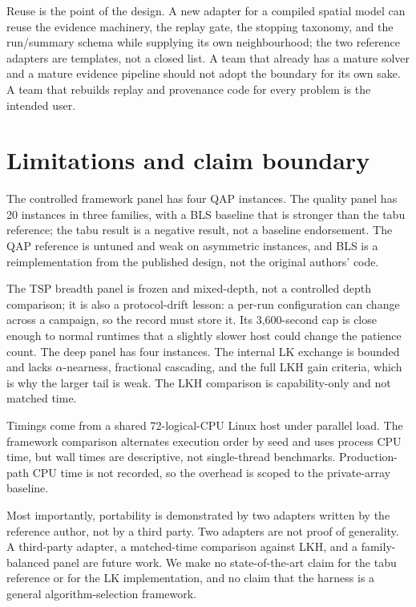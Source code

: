 \documentclass[10pt]{article}
\begin{document}
Reuse is the point of the design. A new adapter for a compiled spatial model can reuse the evidence
machinery, the replay gate, the stopping taxonomy, and the run/summary schema while supplying its
own neighbourhood; the two reference adapters are templates, not a closed list. A team that already
has a mature solver and a mature evidence pipeline should not adopt the boundary for its own sake.
A team that rebuilds replay and provenance code for every problem is the intended user.

\section{Limitations and claim boundary}

The controlled framework panel has four QAP instances. The quality panel has 20 instances in three
families, with a BLS baseline that is stronger than the tabu reference; the tabu result is a negative
result, not a baseline endorsement. The QAP reference is untuned and weak on asymmetric instances,
and BLS is a reimplementation from the published design, not the original authors' code.

The TSP breadth panel is frozen and mixed-depth, not a controlled depth comparison; it is also a
protocol-drift lesson: a per-run configuration can change across a campaign, so the record must store
it. Its 3,600-second
cap is close enough to normal runtimes that a slightly slower host could change the patience count.
The deep panel has four instances. The internal LK exchange is bounded and lacks $\alpha$-nearness,
fractional cascading, and the full LKH gain criteria, which is why the larger tail is weak. The LKH
comparison is capability-only and not matched time.

Timings come from a shared 72-logical-CPU Linux host under parallel load. The framework comparison
alternates execution order by seed and uses process CPU time, but wall times are descriptive, not
single-thread benchmarks. Production-path CPU time is not recorded, so the overhead is scoped to the
private-array baseline.

Most importantly, portability is demonstrated by two adapters written by the reference author, not
by a third party. Two adapters are not proof of generality. A third-party adapter, a matched-time
comparison against LKH, and a family-balanced panel are future work. We make no state-of-the-art
claim for the tabu reference or for the LK implementation, and no claim that the harness is a general
algorithm-selection framework.
\end{document}
